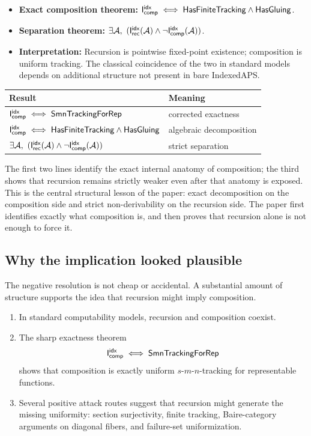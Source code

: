 \documentclass[11pt]{article}
\begin{document}
\begin{itemize}[leftmargin=2em]
\item \textbf{Exact composition theorem:}
  \(\mathsf{I}_{\mathsf{comp}}^{\mathsf{idx}} \iff \mathsf{HasFiniteTracking} \wedge \mathsf{HasGluing}\).
\item \textbf{Separation theorem:}
  \(\exists \aps,\ (\IrecIdx(\aps) \wedge \neg \IcompIdx(\aps))\).
\item \textbf{Interpretation:} Recursion is pointwise fixed-point existence; composition is uniform tracking.  The classical coincidence of the two in standard models depends on additional structure not present in bare IndexedAPS.
\end{itemize}

\begin{center}
\begin{tabular}{ll}
\toprule
Result & Meaning \\
\midrule
\(\mathsf{I}_{\mathsf{comp}}^{\mathsf{idx}} \iff \mathsf{SmnTrackingForRep}\) & corrected exactness \\
\(\mathsf{I}_{\mathsf{comp}}^{\mathsf{idx}} \iff \mathsf{HasFiniteTracking} \wedge \mathsf{HasGluing}\) & algebraic decomposition \\
\(\exists \aps,\ (\IrecIdx(\aps) \wedge \neg \IcompIdx(\aps))\) & strict separation \\
\bottomrule
\end{tabular}
\end{center}

The first two lines identify the exact internal anatomy of composition; the third shows that recursion remains strictly weaker even after that anatomy is exposed.  This is the central structural lesson of the paper: exact decomposition on the composition side and strict non-derivability on the recursion side.  The paper first identifies exactly what composition is, and then proves that recursion alone is not enough to force it.

\subsection{Why the implication looked plausible}

The negative resolution is not cheap or accidental.  A substantial amount of structure supports the idea that recursion might imply composition.

\begin{enumerate}[label=(\roman*),leftmargin=2em]
\item In standard computability models, recursion and composition coexist.
\item The sharp exactness theorem
\[
\mathsf{I}_{\mathsf{comp}}^{\mathsf{idx}} \;\Longleftrightarrow\; \mathsf{SmnTrackingForRep}
\]
shows that composition is exactly uniform \(s\)-\(m\)-\(n\)-tracking for representable functions.
\item Several positive attack routes suggest that recursion might generate the missing uniformity:
  section surjectivity, finite tracking, Baire-category arguments on diagonal fibers, and failure-set uniformization.
\end{enumerate}
\end{document}
